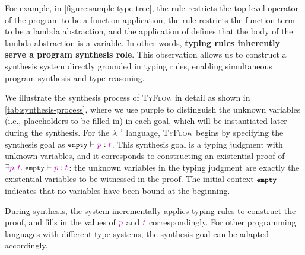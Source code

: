 \documentclass[manuscript,screen]{acmart}
\newcommand{\stlctype}[3]{{#1} \vdash {#2} : {#3}}
\newcommand{\sk}[1]{\textcolor{skunknown}{#1}}
\newcommand{\toolname}[1]{\textsc{#1}}
\newcommand{\tcode}[1]{{\small \texttt{\spaceskip=0.2em #1}}}
\newcommand{\mainname}{\toolname{TyFlow}\xspace}
\newcommand{\stlc}{\lambda^{\rightarrow}}
\begin{document}
For example, in \autoref{figure:sample-type-tree}, the  rule restricts the top-level operator of the program to be a function application, the  rule restricts the function term to be a lambda abstraction, and the application of  defines that the body of the lambda abstraction is a variable. 
In other words, \textbf{typing rules inherently serve a program synthesis role}. This observation allows us to construct a synthesis system directly grounded in typing rules, enabling simultaneous program synthesis and type reasoning.

We illustrate the synthesis process of \mainname in detail as shown in \autoref{tab:synthesis-process}, where we use \sk{purple} to distinguish the unknown variables (i.e., placeholders to be filled in) in each goal, which will be instantiated later during the synthesis.
%
For the $\stlc$ language, \mainname begins by specifying the synthesis goal as $\stlctype{\tcode{empty}}{\sk{p}}{\sk{t}}$. This synthesis goal is a typing judgment with unknown variables, and it corresponds to constructing an existential proof of $\exists \sk{p}, \sk{t}.\; \stlctype{\tcode{empty}}{\sk{p}}{\sk{t}}$: the unknown variables in the typing judgment are exactly the existential variables to be witnessed in the proof. The initial context $\tcode{empty}$ indicates that no variables have been bound at the beginning.

During synthesis, the system incrementally applies typing rules to construct the proof, and fills in the values of $\sk{p}$ and $\sk{t}$ correspondingly. For other programming languages with different type systems, the synthesis goal can be adapted accordingly. 
\end{document}
